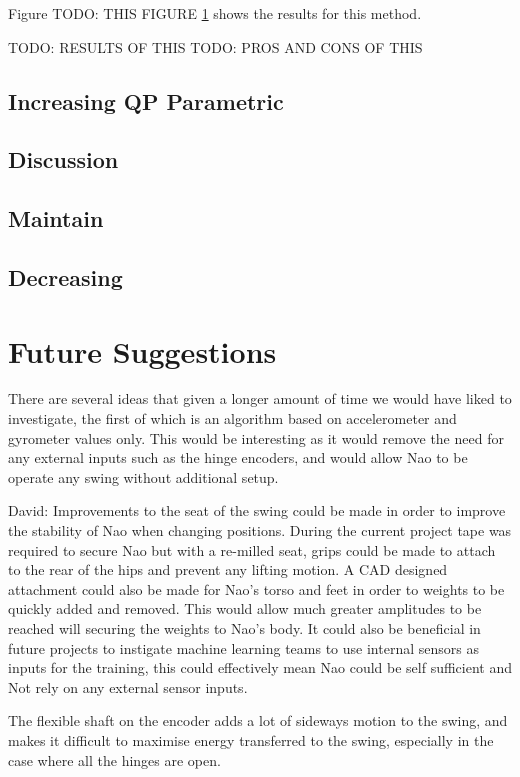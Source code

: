 \documentclass[11pt]{article}
\newcommand*\ruleline[1]{\par\noindent\raisebox{.8ex}{\makebox[\linewidth]{\hrulefill\hspace{1ex}\raisebox{-.8ex}{#1}\hspace{1ex}\hrulefill}}}
\begin{document}
Figure TODO: THIS FIGURE \ref{} shows the results for this method. 

TODO: RESULTS OF THIS
TODO: PROS AND CONS OF THIS

\subsection{Increasing QP Parametric}



\subsection{Discussion}
\subsection{Maintain}
\subsection{Decreasing}

\section{Future Suggestions}
\ruleline{Code Team}
There are several ideas that given a longer amount of time we would have liked to investigate, the first of which is an algorithm based on accelerometer and gyrometer values only. This would be interesting as it would remove the need for any external inputs such as the hinge encoders, and would allow Nao to be operate any swing without additional setup.

David: Improvements to the seat of the swing could be made in order to improve the stability of Nao when changing positions. During the current project tape was required to secure Nao but with a re-milled seat, grips could be made to attach to the rear of the hips and prevent any lifting motion. A CAD designed attachment could also be made for Nao's torso and feet in order to weights to be quickly added and removed. This would allow much greater amplitudes to be reached will securing the weights to Nao's body. It could also be beneficial in future projects to instigate machine learning teams to use internal sensors as inputs for the training, this could effectively mean Nao could be self sufficient and Not rely on any external sensor inputs.

The flexible shaft on the encoder adds a lot of sideways motion to the swing, and makes it difficult to maximise energy transferred to the swing, especially in the case where all the hinges are open. 
\appendix
\end{document}
